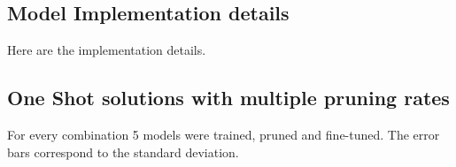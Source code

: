 \label{sec:supplementary}

\subsection{Model Implementation details}
\label{sebsec:implementation_details}
Here are the implementation details.
\subsection*{One Shot solutions with multiple pruning rates}

\label{subsec:OneShotPruningrates}
For every combination 5 models were trained, pruned and fine-tuned. The error bars correspond to the standard deviation.

